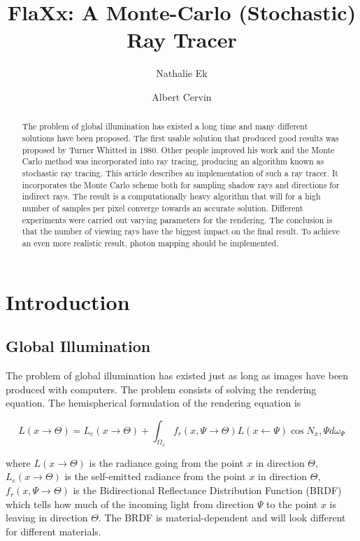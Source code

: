\documentclass[a4paper]{report}
\begin{document}
\title{FlaXx: A Monte-Carlo (Stochastic) Ray Tracer}
\author{Nathalie Ek \and Albert Cervin}

\maketitle

\begin{abstract}
The problem of global illumination has existed a long time and many
different solutions have been proposed. The first usable solution that
produced good results was proposed by Turner Whitted \cite{whitted} in
1980. Other people improved his work and the Monte Carlo method was
incorporated into ray tracing, producing an algorithm known as
stochastic ray tracing. This article describes an implementation of
such a ray tracer. It incorporates the Monte Carlo scheme both for
sampling shadow rays and directions for indirect rays. The result is a
computationally heavy algorithm that will for a high number of samples
per pixel converge towards an accurate solution. Different experiments
were carried out varying parameters for the rendering. The conclusion
is that the number of viewing rays have the biggest impact on the
final result. To achieve an even more realistic result, photon mapping
should be implemented.
\end{abstract}

\tableofcontents

\listoffigures

\chapter{Introduction}

\section{Global Illumination}

The problem of global illumination has existed just as long as images
have been produced with computers. The problem consists of solving the
rendering equation. The hemispherical formulation of the rendering equation is

\begin{equation}
  L(x \to \Theta) = L_e(x \to \Theta) + \int_{\Omega_x}f_r(x,\Psi \to \Theta)L(x \gets \Psi)\cos{N_x,\Psi}d\omega_\Psi
  \label{eq:renderingeq}
\end{equation}

where \(L(x \to \Theta)\) is the radiance going from the point \(x\)
in direction \(\Theta\), \(L_e(x \to \Theta) \) is the self-emitted
radiance from the point \(x\) in direction \(\Theta\), \(f_r(x,\Psi
\to \Theta)\) is the Bidirectional Reflectance Distribution Function
(BRDF) which tells how much of the incoming light from direction
\(\Psi\) to the point \(x\) is leaving in direction \(\Theta\). The
BRDF is material-dependent and will look different for different materials.
\end{document}
